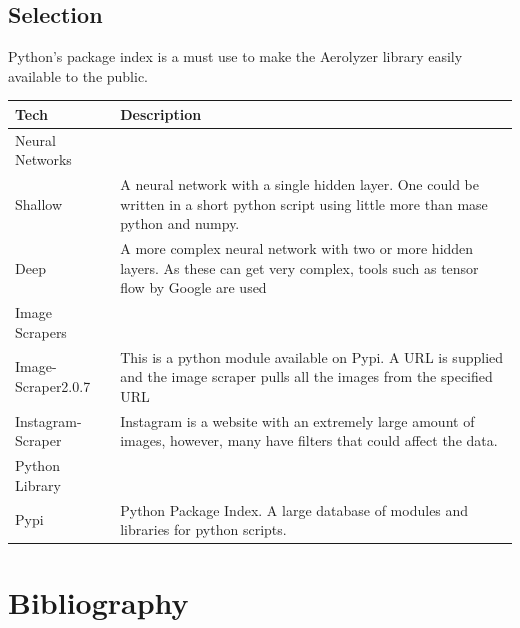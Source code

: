 \documentclass[onecolumn, draftclsnofoot,10pt, compsoc]{IEEEtran}
\begin{document}
\begin{singlespace}
\subsection{Selection}
Python's package index is a must use to make the Aerolyzer library easily available to the public. 

\begin{table}[h!]
\centering
 \begin{tabular}{||p{6cm}  p{11cm}||} 
 \hline
 Tech & Description\\ [0.5ex] 
 \hline\hline
 Neural Networks&\\
 \hline
 Shallow & A neural network with a single hidden layer. One could be written in a short python script using little more than mase python and numpy.\\
 
 Deep & A more complex neural network with two or more hidden layers. As these can get very complex, tools such as tensor flow by Google are used\\
 \hline
 Image Scrapers&\\
 \hline
 Image-Scraper2.0.7 & This is a python module available on Pypi. A URL is supplied and the image scraper pulls all the images from the specified URL \\
 Instagram-Scraper & Instagram is a website with an extremely large amount of images, however, many have filters that could affect the data. \\
 \hline
 Python Library&\\
 \hline
 Pypi & Python Package Index. A large database of modules and libraries for python scripts.  \\ [1ex] 
 \hline
 \end{tabular}
\end{table}

\section{Bibliography}



\end{singlespace}
\end{document}
